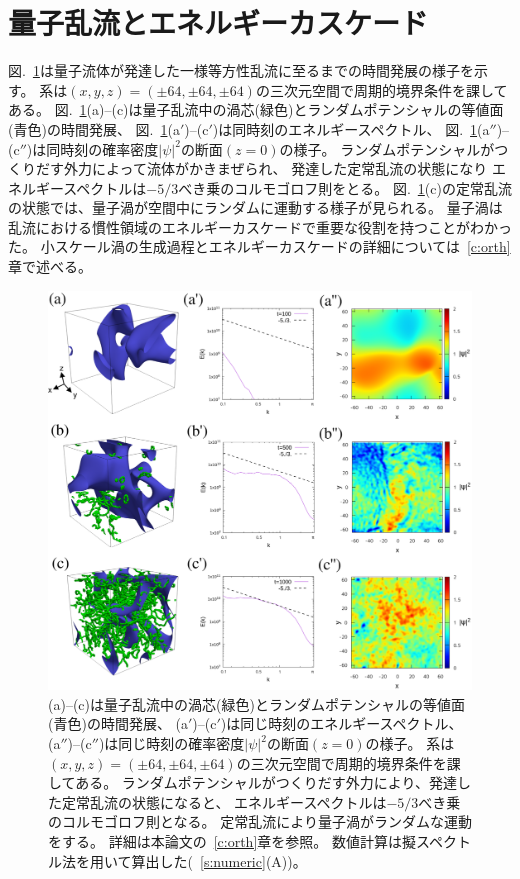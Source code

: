 \documentclass[12pt,a4paper]{jbook}
\begin{document}
		\section{量子乱流とエネルギーカスケード}
        図.~\ref{FIG:turbulent}は量子流体が発達した一様等方性乱流に至るまでの時間発展の様子を示す。
        系は$(x,y,z)=(\pm64,\pm64,\pm64)$の三次元空間で周期的境界条件を課してある。
	    図.~\ref{FIG:turbulent}(a)--(c)は量子乱流中の渦芯(緑色)とランダムポテンシャルの等値面(青色)の時間発展、
        図.~\ref{FIG:turbulent}(a$'$)--(c$'$)は同時刻のエネルギースペクトル、
        図.~\ref{FIG:turbulent}(a$''$)--(c$''$)は同時刻の確率密度$|\psi|^2$の断面$(z=0)$の様子。
        ランダムポテンシャルがつくりだす外力によって流体がかきまぜられ、
        発達した定常乱流の状態になり
        エネルギースペクトルは$-5/3$べき乗のコルモゴロフ則をとる。
        図.~\ref{FIG:turbulent}(c)の定常乱流の状態では、量子渦が空間中にランダムに運動する様子が見られる。
        量子渦は乱流における慣性領域のエネルギーカスケードで重要な役割を持つことがわかった。
        小スケール渦の生成過程とエネルギーカスケードの詳細については~\ref{c:orth}章で述べる。
		\begin{figure}[H]
			\centering
			\includegraphics[width=16cm]{turbulent.eps}
			\caption{
			    (a)--(c)は量子乱流中の渦芯(緑色)とランダムポテンシャルの等値面(青色)の時間発展、
                (a$'$)--(c$'$)は同じ時刻のエネルギースペクトル、
                (a$''$)--(c$''$)は同じ時刻の確率密度$|\psi|^2$の断面$(z=0)$の様子。
                系は$(x,y,z)=(\pm64,\pm64,\pm64)$の三次元空間で周期的境界条件を課してある。
                ランダムポテンシャルがつくりだす外力により、発達した定常乱流の状態になると、
                エネルギースペクトルは$-5/3$べき乗のコルモゴロフ則となる。
                定常乱流により量子渦がランダムな運動をする。
                詳細は本論文の~\ref{c:orth}章を参照。
                数値計算は擬スペクトル法を用いて算出した(~\ref{s:numeric}(A))。
			}
			\label{FIG:turbulent}
		\end{figure}
\end{document}
